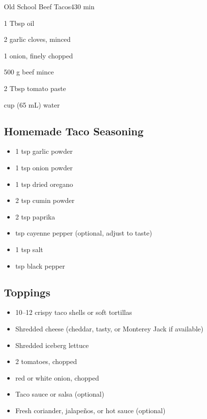 \newpage


\newpage
\begin{recipebox}{Old School Beef Tacos}{4}{30 min}
\begin{ingredients}
  \item 1 Tbsp oil
  \item 2 garlic cloves, minced
  \item 1 onion, finely chopped
  \item 500 g beef mince
  \item 2 Tbsp tomato paste
  \item {} cup (65 mL) water
\end{ingredients}

\subsection*{Homemade Taco Seasoning}
\begin{itemize}[leftmargin=2em]
  \item 1 tsp garlic powder
  \item 1 tsp onion powder
  \item 1 tsp dried oregano
  \item 2 tsp cumin powder
  \item 2 tsp paprika
  \item {} tsp cayenne pepper (optional, adjust to taste)
  \item 1 tsp salt
  \item {} tsp black pepper
\end{itemize}

\subsection*{Toppings}
\begin{itemize}[leftmargin=2em]
  \item 10–12 crispy taco shells or soft tortillas
  \item Shredded cheese (cheddar, tasty, or Monterey Jack if available)
  \item Shredded iceberg lettuce
  \item 2 tomatoes, chopped
  \item {} red or white onion, chopped
  \item Taco sauce or salsa (optional)
  \item Fresh coriander, jalapeños, or hot sauce (optional)
\end{itemize}


\end{recipebox}
